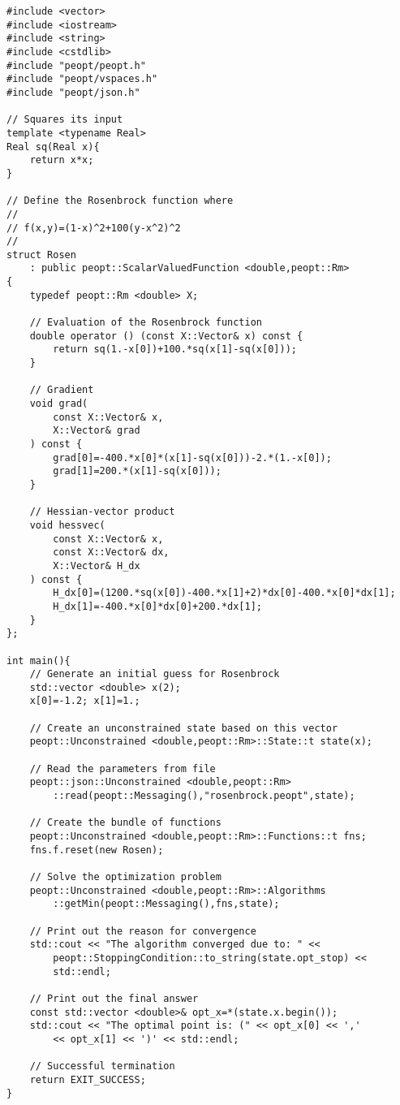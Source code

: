 \begin{lstlisting}[style=C++,caption={This example program minimizes the Rosenbrock function.  The code for this example can be found under \protect\path{cpp/examples/rosenbrock} in the installation directory.},label=lst:Rosen]
#include <vector>
#include <iostream>
#include <string>
#include <cstdlib>
#include "peopt/peopt.h"
#include "peopt/vspaces.h"
#include "peopt/json.h"

// Squares its input
template <typename Real>
Real sq(Real x){
    return x*x;
}

// Define the Rosenbrock function where
// 
// f(x,y)=(1-x)^2+100(y-x^2)^2
//
struct Rosen
    : public peopt::ScalarValuedFunction <double,peopt::Rm>
{
    typedef peopt::Rm <double> X;

    // Evaluation of the Rosenbrock function
    double operator () (const X::Vector& x) const {
        return sq(1.-x[0])+100.*sq(x[1]-sq(x[0]));
    }

    // Gradient
    void grad(
        const X::Vector& x,
        X::Vector& grad
    ) const {
        grad[0]=-400.*x[0]*(x[1]-sq(x[0]))-2.*(1.-x[0]);
        grad[1]=200.*(x[1]-sq(x[0]));
    }

    // Hessian-vector product
    void hessvec(
        const X::Vector& x,
        const X::Vector& dx,
        X::Vector& H_dx
    ) const {
        H_dx[0]=(1200.*sq(x[0])-400.*x[1]+2)*dx[0]-400.*x[0]*dx[1];
        H_dx[1]=-400.*x[0]*dx[0]+200.*dx[1];
    }
};

int main(){
    // Generate an initial guess for Rosenbrock
    std::vector <double> x(2);
    x[0]=-1.2; x[1]=1.;

    // Create an unconstrained state based on this vector
    peopt::Unconstrained <double,peopt::Rm>::State::t state(x);

    // Read the parameters from file
    peopt::json::Unconstrained <double,peopt::Rm>
        ::read(peopt::Messaging(),"rosenbrock.peopt",state);

    // Create the bundle of functions 
    peopt::Unconstrained <double,peopt::Rm>::Functions::t fns;
    fns.f.reset(new Rosen);

    // Solve the optimization problem
    peopt::Unconstrained <double,peopt::Rm>::Algorithms
        ::getMin(peopt::Messaging(),fns,state);

    // Print out the reason for convergence
    std::cout << "The algorithm converged due to: " <<
        peopt::StoppingCondition::to_string(state.opt_stop) <<
        std::endl;

    // Print out the final answer
    const std::vector <double>& opt_x=*(state.x.begin());
    std::cout << "The optimal point is: (" << opt_x[0] << ','
        << opt_x[1] << ')' << std::endl;

    // Successful termination
    return EXIT_SUCCESS;
}
\end{lstlisting}
